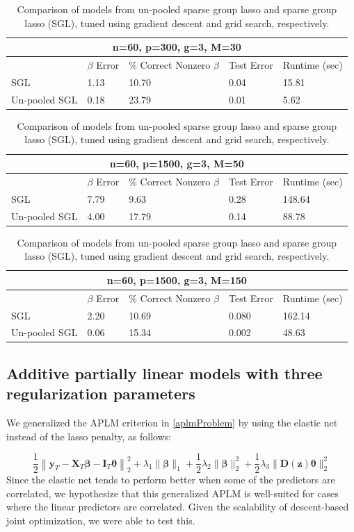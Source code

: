 \documentclass[12pt,letterpaper]{article}
\begin{document}
\begin{table}
\begin{center}
\begin{tabular}{| l | l | l | l | l | }
\hline
\multicolumn{5}{|c|}{n=60, p=300, g=3, M=30}\\
\hline
 & $\beta$ Error & \% Correct Nonzero $\beta$ & Test Error & Runtime (sec) \\
\hline
SGL & 1.13 & 10.70 & 0.04 & 15.81 \\
\hline
Un-pooled SGL & 0.18 & 23.79 & 0.01 & 5.62 \\
\hline
\end{tabular}

\begin{tabular}{| l | l | l | l | l | }
\hline
\multicolumn{5}{|c|}{n=60, p=1500, g=3, M=50}\\
\hline
 & $\beta$ Error & \% Correct Nonzero $\beta$ & Test Error & Runtime (sec) \\
\hline
SGL & 7.79 & 9.63 & 0.28 & 148.64 \\
\hline
Un-pooled SGL & 4.00 & 17.79 & 0.14 & 88.78 \\
\hline
\end{tabular}

\begin{tabular}{| l | l | l | l | l | }
\hline
\multicolumn{5}{|c|}{n=60, p=1500, g=3, M=150}\\
\hline
 & $\beta$ Error & \% Correct Nonzero $\beta$ & Test Error & Runtime (sec) \\
\hline
SGL & 2.20 & 10.69 & 0.080 & 162.14 \\
\hline
Un-pooled SGL & 0.06 & 15.34 & 0.002 & 48.63 \\
\hline
\end{tabular}
\end{center}
\caption {Comparison of models from un-pooled sparse group lasso and sparse group lasso (SGL), tuned using gradient descent and grid search, respectively.}
\label{table:unpooled}
\end{table}

\subsection{Additive partially linear models with three regularization parameters}
We generalized the APLM criterion in \eqref{aplmProblem} by using the elastic net instead of the lasso penalty, as follows:

\begin{equation}
\frac{1}{2} \left \|
\boldsymbol{y}_T
- \boldsymbol{X}_T\boldsymbol{\beta}
- \boldsymbol{I}_T \boldsymbol{\theta} \right \|^2_2
+ \lambda_1 \| \boldsymbol \beta \|_1
+ \frac{1}{2} \lambda_2 \| \boldsymbol \beta \|_2^2
+ \frac{1}{2} \lambda_3 \| \boldsymbol D(\boldsymbol z) \boldsymbol \theta \|_2^2
\end{equation}
Since the elastic net tends to perform better when some of the predictors are correlated, we hypothesize that this generalized APLM is well-suited for cases where the linear predictors are correlated. Given the scalability of descent-based joint optimization, we were able to test this.
\end{document}
